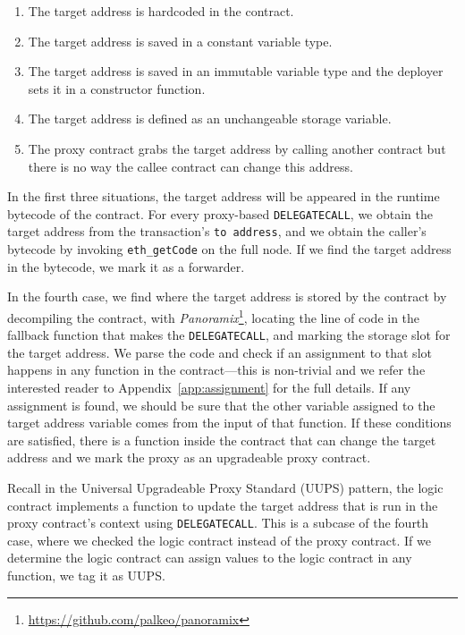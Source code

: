 \begin{enumerate}
  \item The target address is hardcoded in the contract.
  \item The target address is saved in a constant variable type.
  \item The target address is saved in an immutable variable type and the deployer sets it in a constructor function.
  \item The target address is defined as an unchangeable storage variable.
  \item The proxy contract grabs the target address by calling another contract but there is no way the callee contract can change this address.
\end{enumerate}

In the first three situations, the target address will be appeared in the runtime bytecode of the contract. For every proxy-based \texttt{DELEGATECALL}, we obtain the target address from the transaction's \texttt{to address}, and we obtain the caller's bytecode by invoking \texttt{eth\_getCode} on the full node. If we find the target address in the bytecode, we mark it as a forwarder. 

In the fourth case, we find where the target address is stored by the contract by decompiling the contract, with \textit{Panoramix}\footnote{\url{https://github.com/palkeo/panoramix}}, locating the line of code in the fallback function that makes the \texttt{DELEGATECALL}, and marking the storage slot for the target address. We parse the code and check if an assignment to that slot happens in any function in the contract---this is non-trivial and we refer the interested reader to Appendix~\ref{app:assignment} for the full details. If any assignment is found, we should be sure that the other variable assigned to the target address variable comes from the input of that function. If these conditions are satisfied, there is a function inside the contract that can change the target address and we mark the proxy as an upgradeable proxy contract. 

Recall in the Universal Upgradeable Proxy Standard (UUPS) pattern, the logic contract implements a function to update the target address that is run in the proxy contract's context using \texttt{DELEGATECALL}. This is a subcase of the fourth case, where we checked the logic contract instead of the proxy contract. If we determine the logic contract can assign values to the logic contract in any function, we tag it as UUPS.

